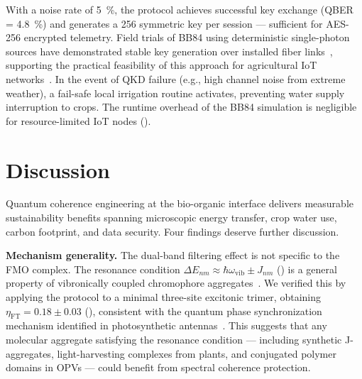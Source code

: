 \documentclass[12pt]{article}
\begin{document}
With a noise rate of \SI{5}{\percent}, the protocol achieves successful key exchange (QBER = \SI{4.8}{\percent}) and generates a \SI{256}{\bit} symmetric key per session --- sufficient for AES-256 encrypted telemetry.
Field trials of BB84 using deterministic single-photon sources have demonstrated stable key generation over installed fiber links~\cite{Zahidy2024}, supporting the practical feasibility of this approach for agricultural IoT networks~\cite{Bakyt2025}.
In the event of QKD failure (e.g., high channel noise from extreme weather), a fail-safe local irrigation routine activates, preventing water supply interruption to crops.
The runtime overhead of the BB84 simulation is negligible for resource-limited IoT nodes ().


\section*{Discussion}

Quantum coherence engineering at the bio-organic interface delivers measurable sustainability benefits spanning microscopic energy transfer, crop water use, carbon footprint, and data security.
Four findings deserve further discussion.

\textbf{Mechanism generality.} The dual-band filtering effect is not specific to the FMO complex.
The resonance condition $\Delta E_{nm} \approx \hbar\omega_{\mathrm{vib}} \pm J_{nm}$ () is a general property of vibronically coupled chromophore aggregates~\cite{Chin2013}.
We verified this by applying the protocol to a minimal three-site excitonic trimer, obtaining $\eta_{\mathrm{FT}} = 0.18 \pm 0.03$ (), consistent with the quantum phase synchronization mechanism identified in photosynthetic antennas~\cite{Zhu2024}.
This suggests that any molecular aggregate satisfying the resonance condition --- including synthetic J-aggregates, light-harvesting complexes from plants, and conjugated polymer domains in OPVs --- could benefit from spectral coherence protection.
\end{document}
